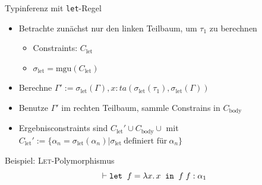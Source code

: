 \documentclass{beamer}
\begin{document}
\begin{frame}{Typinferenz mit \texttt{let}-Regel}
    \begin{itemize}
        \item Betrachte zunächst nur den linken Teilbaum, um $\tau_1$ zu berechnen
            \begin{itemize}
                \item Constraints: $C_{\text{let}}$
                \item $\sigma_{\text{let}} = \text{mgu}(C_{\text{let}})$
            \end{itemize}
        \item Berechne $\Gamma':= \sigma_{\text{let}}(\Gamma), x: ta(\sigma_{\text{let}}(\tau_1), \sigma_{\text{let}}(\Gamma))$
        \item Benutze $\Gamma'$ im rechten Teilbaum, sammle Constrains in $C_{\text{body}}$
        \item Ergebnisconstraints sind $C_{\text{let}}' \cup C_{\text{body}} \cup$ mit $C_{\text{let}}' := \{\alpha_n = \sigma_{\text{let}}(\alpha_n)|\sigma_{\text{let}} \: \text{definiert für} \: \alpha_n\}$
    \end{itemize}
\end{frame}

\begin{frame}{Beispiel: \textsc{Let}-Polymorphismus}
    $$\vdash \texttt{let} \;\; f = \lambda x.\, x \;\; \texttt{in} \;\; f\;f : \alpha_1$$
\end{frame}
\end{document}
